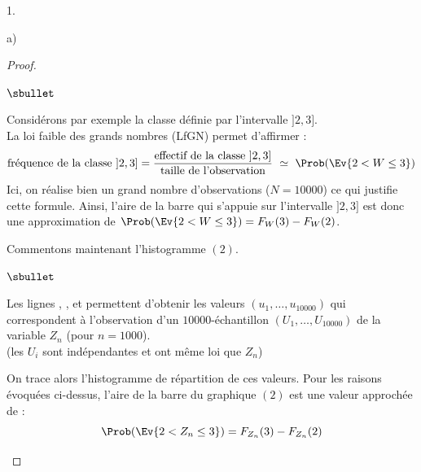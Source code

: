 \begin{noliste}{1.}
\begin{noliste}{a)}
\begin{proof}
\begin{noliste}{$\sbullet$}
    \item Considérons par exemple la classe définie par l'intervalle
      $]2, 3]$.\\
      La loi faible des grands nombres (LfGN) permet d'affirmer :
      \[
      \mbox{fréquence de la classe $]2, 3]$} = \dfrac{\mbox{effectif
          de la classe $]2, 3]$}}{\mbox{taille de l'observation}} \
      \simeq \ \Prob(\Ev{2 < W \leq 3})
      \]
      Ici, on réalise bien un grand nombre d'observations ($N =
      10000$) ce qui justifie cette formule. Ainsi, l'aire de la barre
      qui s'appuie sur l'intervalle $]2, 3]$ est donc une
      approximation de $\Prob(\Ev{2 < W \leq 3}) = F_W(3) - F_W(2)$.
    \end{noliste}
    Commentons maintenant l'histogramme $(2)$.
    \begin{noliste}{$\sbullet$}
    \item Les lignes , , et  permettent
      d'obtenir les valeurs $(u_1, \ldots, u_{10000})$ qui
      correspondent à l'observation d'un $10000$-échantillon $(U_1,
      \ldots, U_{10000})$ de la variable $Z_n$ (pour $n = 1000$).\\
      (les $U_i$ sont indépendantes et ont même loi que $Z_n$)
      
    \item On trace alors l'histogramme de répartition de ces
      valeurs. Pour les raisons évoquées ci-dessus, l'aire de la barre
      du graphique $(2)$ est une valeur approchée de :
      \[
      \Prob(\Ev{2 < Z_n \leq 3}) = F_{Z_n}(3) - F_{Z_n}(2)
      \]
    \end{noliste}%


    \newpage



\end{proof}
\end{noliste}
\end{noliste}
